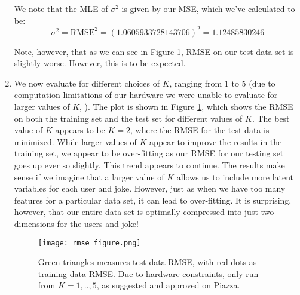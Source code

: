 \documentclass{harvardml}
\theoremstyle{plain}
\begin{document}
\begin{enumerate}[label=(\alph*)]
We note that the MLE of $\sigma^2$ is given by our MSE, which we've calculated to be:
$$
\sigma^2 = \text{RMSE}^2 = (1.0605933728143706)^2 = 1.12485830246
$$

Note, however, that as we can see in Figure \ref{fig:rmse}, RMSE on our test data set is slightly worse. However, this is to be expected.

\item
We now evaluate for different choices of $K$, ranging from $1$ to $5$ (due to computation limitations of our hardware we were unable to evaluate for larger values of $K$, ). The plot is shown in Figure \ref{fig:rmse}, which shows the RMSE on both the training set and the test set for different values of $K$. The best value of $K$ appears to be $K=2$, where the RMSE for the test data is minimized. While larger values of $K$ appear to improve the results in the training set, we appear to be over-fitting as our RMSE for our testing set goes up ever so slightly. This trend appears to continue. The results make sense if we imagine that a larger value of $K$ allows us to include more latent variables for each user and joke. However, just as when we have too many features for a particular data set, it can lead to over-fitting. It is surprising, however, that our entire data set is optimally compressed into just two dimensions for the users and joke!

\begin{figure}[h!]
\centering
\texttt{[image: rmse\_figure.png]}
\caption{Green triangles measures test data RMSE, with red dots as training data RMSE. Due to hardware constraints, only run from $K=1,..,5$, as suggested and approved on Piazza.}
\label{fig:rmse}
\end{figure}


\end{enumerate}
\end{document}
